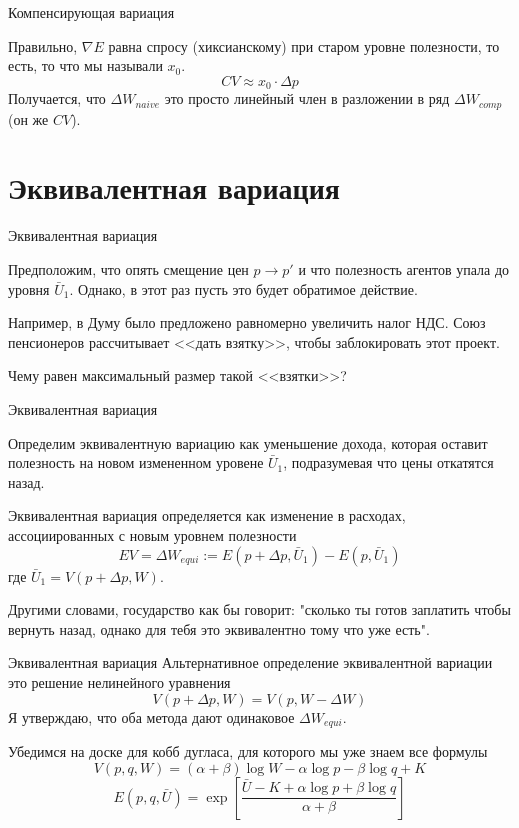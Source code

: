 \documentclass{beamer}
\begin{document}
\begin{frame}{Компенсирующая вариация}

Правильно, $\nabla E$ равна спросу (хиксианскому) при старом уровне полезности, то есть, то что мы называли $x_0$.
$$CV \approx x_0 \cdot \Delta p$$
Получается, что $\Delta W_{naive}$ это просто линейный член в разложении в ряд $\Delta W_{comp}$ (он же  $CV$).

\end{frame}

\section{Эквивалентная вариация}

\begin{frame}{Эквивалентная вариация}

Предположим, что опять смещение цен $p \to p'$ и что полезность агентов упала до уровня $\bar U_1$. Однако, в этот раз пусть это будет обратимое действие. 

Например, в Думу было предложено равномерно увеличить налог НДС. Союз пенсионеров рассчитывает <<дать взятку>>, чтобы заблокировать этот проект.

Чему равен максимальный размер такой <<взятки>>?

\end{frame}

\begin{frame}{Эквивалентная вариация}

Определим эквивалентную вариацию как уменьшение дохода, которая оставит полезность на новом измененном уровене $\bar U_1$, подразумевая что цены откатятся назад.

\begin{definition}

\alert{Эквивалентная вариация} определяется как изменение в расходах, ассоциированных с новым уровнем полезности
$$EV = \Delta W_{equi} := E(p+ \Delta p,\bar U_1) - E(p,\bar U_1)$$
где $\bar U_1 = V(p+\Delta p, W)$.
\end{definition}
Другими словами, государство как бы говорит: "сколько ты готов заплатить чтобы вернуть назад, однако для тебя это \alert{эквивалентно} тому что уже есть".

\end{frame}

\begin{frame}{Эквивалентная вариация}
Альтернативное определение эквивалентной вариации это решение нелинейного уравнения 
$$ V(p+\Delta p,W) = V(p, W - \Delta W)$$
Я утверждаю, что оба метода дают одинаковое $\Delta W_{equi}$. 

Убедимся на доске для кобб дугласа, для которого мы уже знаем все формулы
$$ V(p,q,W) = (\alpha + \beta) \log W - \alpha \log p - \beta \log q + K$$
$$ E(p,q,\bar U) = \exp[\frac{\bar U - K + \alpha \log p + \beta \log q}{\alpha + \beta}]$$

\end{frame}
\end{document}
